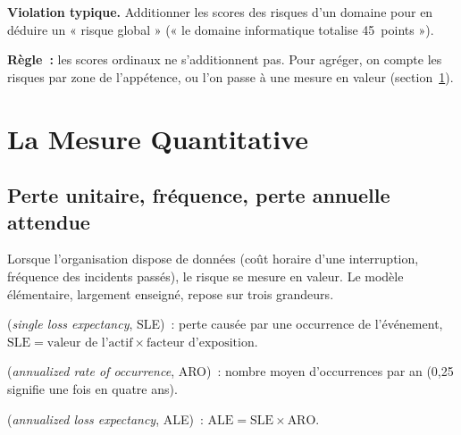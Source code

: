\begin{boxalert}
\textbf{Violation typique.} Additionner les scores des risques d'un domaine
pour en déduire un « risque global » (« le domaine informatique totalise
45~points »).

\smallskip
\textbf{Règle~:} les scores ordinaux ne s'additionnent pas. Pour agréger,
on compte les risques par zone de l'appétence, ou l'on passe à une mesure
en valeur (section~\ref{sec:c04-quantitatif}).
\end{boxalert}

\section{La Mesure Quantitative}
\label{sec:c04-quantitatif}

\subsection{Perte unitaire, fréquence, perte annuelle attendue}

Lorsque l'organisation dispose de données (coût horaire d'une interruption,
fréquence des incidents passés), le risque se mesure en valeur. Le modèle
élémentaire, largement enseigné, repose sur trois grandeurs.

\begin{boxdef}
 (\textit{single loss
expectancy}, SLE)~: perte causée par une occurrence de l'événement,
$\text{SLE} = \text{valeur de l'actif} \times \text{facteur d'exposition}$.

\medskip
{}
(\textit{annualized rate of occurrence}, ARO)~: nombre moyen d'occurrences
par an (0,25 signifie une fois en quatre ans).

\medskip
{}
(\textit{annualized loss expectancy}, ALE)~:
$\text{ALE} = \text{SLE} \times \text{ARO}$.
\end{boxdef}

